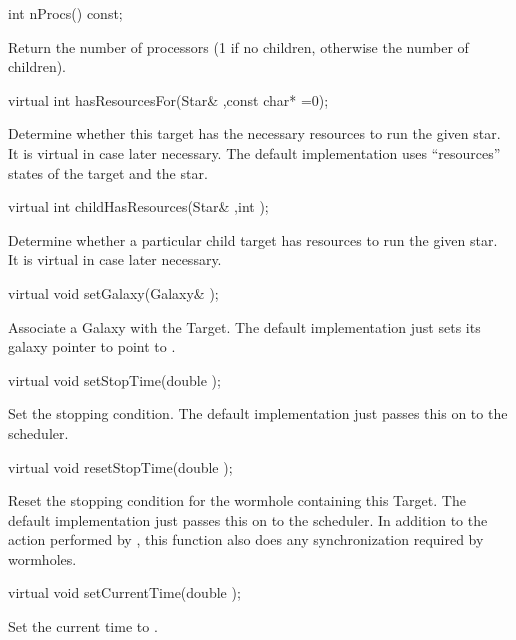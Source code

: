 \begin{example}
int nProcs() const;
\end{example}

Return the number of processors (1 if no children, otherwise the
number of children).

\begin{example}
virtual int hasResourcesFor(Star& ,const char* =0);
\end{example}

Determine whether this target has the necessary resources to run the
given star.  It is virtual in case later necessary.  The default implementation
uses ``resources'' states of the target and the star.

\begin{example}
virtual int childHasResources(Star& ,int );
\end{example}

Determine whether a particular child target has resources
to run the given star.  It is virtual in case later necessary.

\begin{example}
virtual void setGalaxy(Galaxy& );
\end{example}

Associate a Galaxy with the Target.  The default implementation
just sets its galaxy pointer  to point to .

\begin{example}
virtual void setStopTime(double );
\end{example}

Set the stopping condition.  The default implementation just passes
this on to the scheduler.

\begin{example}
virtual void resetStopTime(double );
\end{example}

Reset the stopping condition for the wormhole containing this Target.
The default implementation just passes this on to the scheduler.  In
addition to the action performed by , this function
also does any synchronization required by wormholes.

\begin{example}
virtual void setCurrentTime(double );
\end{example}

Set the current time to .

